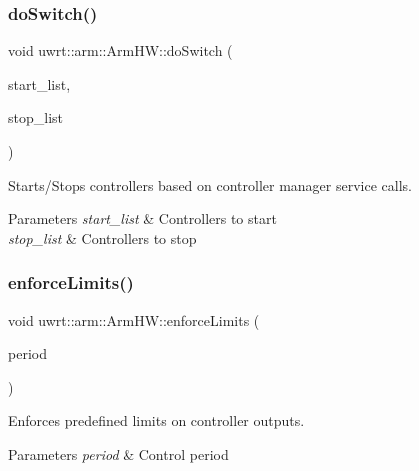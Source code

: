 \subsubsection{\texorpdfstring{do\+Switch()}{doSwitch()}}
{\footnotesize\ttfamily void uwrt\+::arm\+::\+Arm\+H\+W\+::do\+Switch (\begin{DoxyParamCaption}\item[{const std\+::list$<$ hardware\+\_\+interface\+::\+Controller\+Info $>$ \&}]{start\+\_\+list,  }\item[{const std\+::list$<$ hardware\+\_\+interface\+::\+Controller\+Info $>$ \&}]{stop\+\_\+list }\end{DoxyParamCaption})\hspace{0.3cm}{\ttfamily [override]}}



Starts/\+Stops controllers based on controller manager service calls. 


\begin{DoxyParams}{Parameters}
{\em start\+\_\+list} & Controllers to start \\
\hline
{\em stop\+\_\+list} & Controllers to stop \\
\hline
\end{DoxyParams}
\mbox{\label{classuwrt_1_1arm_1_1_arm_h_w_aef2643b05e4070ab7142eca2be62ddd1}} 
\subsubsection{\texorpdfstring{enforce\+Limits()}{enforceLimits()}}
{\footnotesize\ttfamily void uwrt\+::arm\+::\+Arm\+H\+W\+::enforce\+Limits (\begin{DoxyParamCaption}\item[{ros\+::\+Duration}]{period }\end{DoxyParamCaption})}



Enforces predefined limits on controller outputs. 


\begin{DoxyParams}{Parameters}
{\em period} & Control period \\
\hline
\end{DoxyParams}
\mbox{\label{classuwrt_1_1arm_1_1_arm_h_w_a2ded1550eac19e0ea4ac4830fe196ad5}} 
